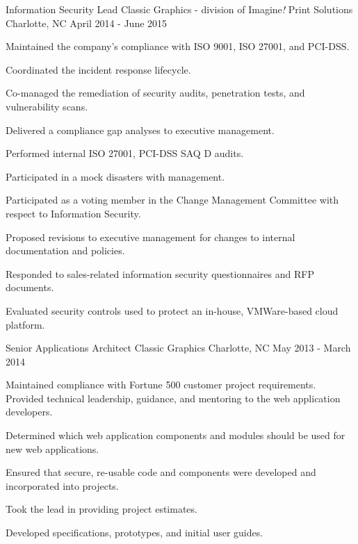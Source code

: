\begin{cventries}

\cventry
{Information Security Lead}
{Classic Graphics - division of Imagine{\it !} Print Solutions} %
{Charlotte, NC} %
{April 2014 - June 2015} %
{
Maintained the company's compliance with ISO 9001, ISO 27001, and PCI-DSS.
\begin{cvitems}
\item[]
\item {Coordinated the incident response lifecycle.}
\item {Co-managed the remediation of security audits, penetration tests, and vulnerability scans.}
\item {Delivered a compliance gap analyses to executive management.}
\item {Performed internal ISO 27001, PCI-DSS SAQ D audits.}
\item {Participated in a mock disasters with management.}
\item {Participated as a voting member in the Change Management Committee with respect to Information Security.}
\item {Proposed revisions to executive management for changes to internal documentation and policies.}
\item {Responded to sales-related information security questionnaires and RFP documents.}
\item {Evaluated security controls used to protect an in-house, VMWare-based cloud platform.}
\end{cvitems}
}


\cventry
{Senior Applications Architect}
{Classic Graphics} %
{Charlotte, NC} %
{May 2013 - March 2014} %
{
Maintained compliance with Fortune 500 customer project requirements. Provided technical leadership, guidance, and mentoring to the web application developers.
\begin{cvitems}
\item[]
\item {Determined which web application components and modules should be used for new web applications.}
\item {Ensured that secure, re-usable code and components were developed and incorporated into projects.}
\item {Took the lead in providing project estimates.}
\item {Developed specifications, prototypes, and initial user guides.}
\end{cvitems}
}


\end{cventries}
